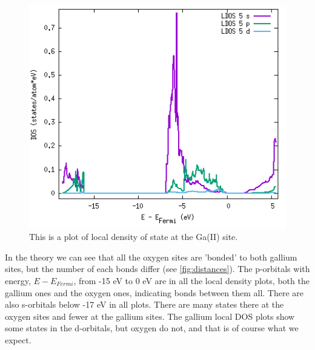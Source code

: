 \begin{figure}[H]
\includegraphics[width=\linewidth]{../fig/dosplot/ldos_Ga_II_primitive}\caption{This is a plot of local density of state at the Ga(II) site.}\label{fig:ldos_Ga_II}
\end{figure}

In the theory we can see that all the oxygen sites are 'bonded' to both gallium sites, but the number of each bonds differ (see \ref{fig:distances}). The p-orbitals with energy, $E-E_{Fermi}$, from -15 eV to 0 eV are in all the local density plots, both the gallium ones and the oxygen ones, indicating bonds between them all. There are also s-orbitals below -17 eV in all plots. There are many states there at the oxygen sites and fewer at the gallium sites. The gallium local DOS plots show some states in the d-orbitals, but oxygen do not, and that is of course what we expect.

